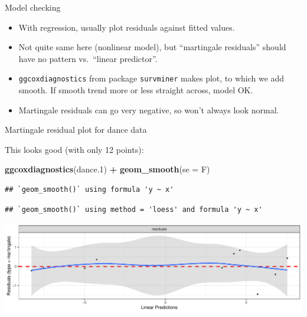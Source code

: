 \documentclass[
  ignorenonframetext,
]{beamer}
\newenvironment{Shaded}{\begin{snugshade}}{\end{snugshade}}
\newcommand{\DataTypeTok}[1]{\textcolor[rgb]{0.13,0.29,0.53}{#1}}
\newcommand{\FloatTok}[1]{\textcolor[rgb]{0.00,0.00,0.81}{#1}}
\newcommand{\KeywordTok}[1]{\textcolor[rgb]{0.13,0.29,0.53}{\textbf{#1}}}
\newcommand{\NormalTok}[1]{#1}
\newcommand{\OperatorTok}[1]{\textcolor[rgb]{0.81,0.36,0.00}{\textbf{#1}}}
\newcommand{\StringTok}[1]{\textcolor[rgb]{0.31,0.60,0.02}{#1}}
\begin{document}
\begin{frame}[fragile]{Model checking}
\protect\hypertarget{model-checking}{}

\begin{itemize}
\item
  With regression, usually plot residuals against fitted values.
\item
  Not quite same here (nonlinear model), but ``martingale residuals''
  should have no pattern vs.~``linear predictor''.
\item
  \texttt{ggcoxdiagnostics} from package \texttt{survminer} makes plot,
  to which we add smooth. If smooth trend more or less straight across,
  model OK.
\item
  Martingale residuals can go very negative, so won't always look
  normal.
\end{itemize}

\end{frame}

\begin{frame}[fragile]{Martingale residual plot for dance data}
\protect\hypertarget{martingale-residual-plot-for-dance-data}{}

This looks good (with only 12 points):

\begin{Shaded}
\begin{Highlighting}[]
\KeywordTok{ggcoxdiagnostics}\NormalTok{(dance}\FloatTok{.1}\NormalTok{) }\OperatorTok{+}\StringTok{ }\KeywordTok{geom_smooth}\NormalTok{(}\DataTypeTok{se =}\NormalTok{ F)}
\end{Highlighting}
\end{Shaded}

\begin{verbatim}
## `geom_smooth()` using formula 'y ~ x'
\end{verbatim}

\begin{verbatim}
## `geom_smooth()` using method = 'loess' and formula 'y ~ x'
\end{verbatim}

\includegraphics{slides_d29_files/figure-beamer/unnamed-chunk-158-1.pdf}

\end{frame}
\end{document}
